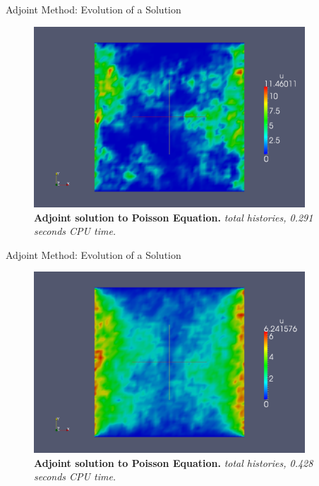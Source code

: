 \documentclass{beamer}
\begin{document}
\begin{frame}{Adjoint Method: Evolution of a Solution}

  \begin{figure}[h!]
    \begin{center}
      \includegraphics[width=4in]{adjoint_1000.png}
    \end{center}
    \caption{\textbf{Adjoint solution to Poisson Equation.}
      \textit{ total histories, 0.291 seconds CPU time.} }
  \end{figure}

\end{frame}

\begin{frame}{Adjoint Method: Evolution of a Solution}

  \begin{figure}[h!]
    \begin{center}
      \includegraphics[width=4in]{adjoint_10000.png}
    \end{center}
    \caption{\textbf{Adjoint solution to Poisson Equation.}
      \textit{ total histories, 0.428 seconds CPU time.} }
  \end{figure}

\end{frame}
\end{document}
